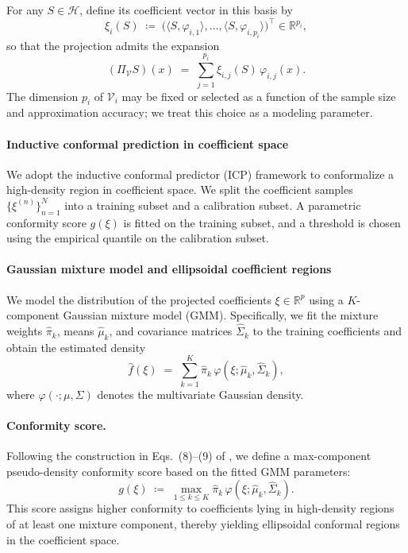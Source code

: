 \documentclass[lettersize,journal]{IEEEtran}
\begin{document}
For any $S\in\mathscr{H}$, define its coefficient vector in this basis by
\begin{equation}\label{eq:coefficient}
\xi_{i}(S)
\;\coloneqq\;
\bigl(\langle S,\varphi_{i,1}\rangle,\ldots,\langle S,\varphi_{i,p_i}\rangle\bigr)^\top
\in\mathbb{R}^{p_i},
\end{equation}
so that the projection admits the expansion
\begin{equation*}
(\Pi_{\mathscr{V}} S)(x) \;=\; \sum_{j=1}^{p_i} \xi_{i,j}(S)\,\varphi_{i,j}(x).
\end{equation*}
The dimension $p_i$ of $\mathscr{V}_i$ may be fixed or selected as a function of the sample size and approximation accuracy;
we treat this choice as a modeling parameter.

\paragraph{Inductive conformal prediction in coefficient space}
\label{sec:icp_coeff}

We adopt the inductive conformal predictor (ICP) framework
\cite{lei2015conformal} to conformalize a high-density region in coefficient space.
We split the coefficient samples $\{\xi^{(n)}\}_{n=1}^N$
into a training subset and a calibration subset.
A parametric conformity score $g(\xi)$ is fitted on the training subset,
and a threshold is chosen using the empirical quantile on the calibration subset.

\paragraph{Gaussian mixture model and ellipsoidal coefficient regions}
\label{sec:gmm_ellipsoids}

We model the distribution of the projected coefficients $\xi \in \mathbb{R}^p$
using a $K$-component Gaussian mixture model (GMM).
Specifically, we fit the mixture weights $\widehat{\pi}_k$, means
$\widehat{\mu}_k$, and covariance matrices $\widehat{\Sigma}_k$
to the training coefficients and obtain the estimated density
\begin{equation*}
\widehat f(\xi)
\;=\;
\sum_{k=1}^K \widehat{\pi}_k\,
\varphi\!\left(\xi;\widehat{\mu}_k,\widehat{\Sigma}_k\right),
\end{equation*}
where $\varphi(\cdot;\mu,\Sigma)$ denotes the multivariate Gaussian density.

\paragraph{Conformity score.}
Following the construction in Eqs.~(8)--(9) of \cite{lei2015conformal},
we define a max-component pseudo-density conformity score
based on the fitted GMM parameters:
\begin{equation*}
g(\xi)
\;\coloneqq\;
\max_{1 \le k \le K}
\widehat{\pi}_k\,
\varphi\!\left(\xi;\widehat{\mu}_k,\widehat{\Sigma}_k\right).
\end{equation*}
This score assigns higher conformity to coefficients lying in high-density
regions of at least one mixture component, thereby yielding
ellipsoidal conformal regions in the coefficient space.
\end{document}
